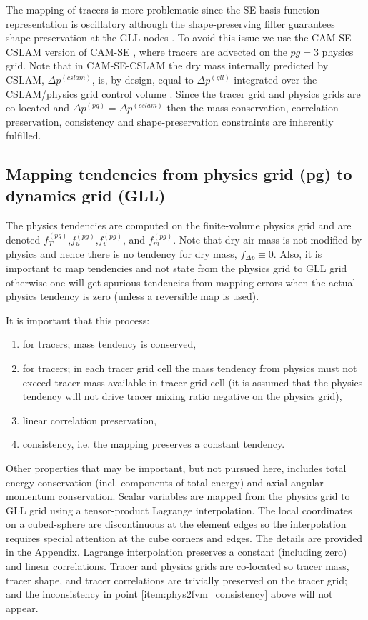 \documentclass[twocol]{ametsoc}
\begin{document}
The mapping of tracers is more problematic since the SE basis function representation is oscillatory although the shape-preserving filter guarantees shape-preservation at the GLL nodes \citep{GTS2014JCP}. To avoid this issue we use the CAM-SE-CSLAM version of CAM-SE \citep[Conservative Semi-Lagrangian Multi-tracer transport scheme][]{LTOUNGK2017MWR}, where tracers are advected on the $pg=3$ physics grid. Note that in CAM-SE-CSLAM the dry mass internally predicted by CSLAM, $\Delta p^{(cslam)}$, is, by design, equal to $\Delta p^{(gll)}$ integrated over the CSLAM/physics grid control volume \citep{LTOUNGK2017MWR}. Since the tracer grid and physics grids are co-located and $\Delta p^{(pg)}=\Delta p^{(cslam)}$ then the  mass conservation, correlation preservation, consistency and shape-preservation constraints are inherently fulfilled.
%
\subsection{Mapping tendencies from physics grid (pg) to dynamics grid (GLL)}
The physics tendencies are computed on the finite-volume physics grid and are denoted $f_T^{(pg)}$,$f_u^{(pg)}$,$f_v^{(pg)}$, and $f_m^{(pg)}$. Note that dry air mass is not modified by physics and hence there is no tendency for dry mass,  $f_{\Delta p}\equiv 0$. Also, it is important to map tendencies and not state from the physics grid to GLL grid otherwise one will get spurious tendencies from mapping errors when the actual physics tendency is zero (unless a reversible map is used).

It is important that this process:
\begin{enumerate}
\item for tracers; mass tendency is conserved,
\item for tracers; in each tracer grid cell the mass tendency from physics must not exceed tracer mass available in tracer grid cell (it is assumed that the physics tendency will not drive tracer mixing ratio negative on the physics grid),\label{item:phys2fvm_consistency}
\item linear correlation preservation,
\item consistency, i.e. the mapping preserves a constant tendency.
\end{enumerate}
Other properties that may be important, but not pursued here, includes total energy conservation (incl. components of total energy) and axial angular momentum conservation. Scalar variables are mapped from {\color{red}the{}} physics grid to GLL grid using a tensor-product Lagrange interpolation. The local coordinates on a cubed-sphere are discontinuous at the element edges so the interpolation requires special attention at the cube corners and edges. The details are provided in the Appendix. Lagrange interpolation preserves a constant (including zero) and linear correlations. Tracer and physics grids are co-located so tracer mass, tracer shape, and tracer correlations are trivially preserved on the tracer grid; and the inconsistency in point \ref{item:phys2fvm_consistency} above will not appear. 
\end{document}
